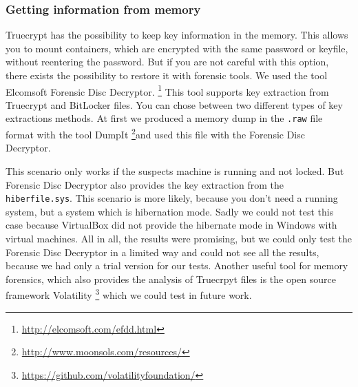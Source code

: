 \subsubsection{Getting information from memory}
Truecrypt has the possibility to keep key information in the memory. 
This allows you to mount containers, which are encrypted with the same password or keyfile, without reentering the password. 
But if you are not careful with this option, there exists the possibility to restore it with forensic tools. 
We used the tool Elcomsoft Forensic Disc Decryptor. \footnote{\url{http://elcomsoft.com/efdd.html}} 
This tool supports key extraction from Truecrypt and BitLocker files. 
You can chose between two different types of key extractions methods. 
At first we produced a memory dump in the \texttt{.raw} file format with the tool DumpIt \footnote{\url{http://www.moonsols.com/resources/}}and used this file with the Forensic Disc Decryptor.

This scenario only works if the suspects machine is running and not locked. 
But Forensic Disc Decryptor also provides the key extraction from the \texttt{hiberfile.sys}. 
This scenario is more likely, because you don't need a running system, but a system which is hibernation mode.  
Sadly we could not test this case because VirtualBox did not provide the hibernate mode in Windows with virtual machines. 
All in all, the results were promising, but we could only test the Forensic Disc Decryptor in a limited way and could not see all the results, because we had only a trial version for our tests. 
Another useful tool for memory forensics, which also provides the analysis of Truecrpyt files is the open source framework Volatility \footnote{\url{https://github.com/volatilityfoundation/}} which we could test in future work.
